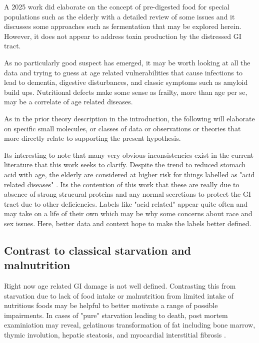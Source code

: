 


A 2025 work did elaborate on the concept of pre-digested
food for special populations such as the elderly
with a detailed review of some issues
\cite{Wu_Pu_Jiang_Enhancing_food_digestion_2025}
and it discusses some approaches such as fermentation
that may be explored herein. However, it does not appear
to address toxin production by the distressed GI 
tract. 

As no particularly good suspect has emerged, it may be worth
looking at all the data and trying to guess at age related
vulnerabilities that cause  infections to lead to dementia,
digestive disturbances, 
and classic symptoms such as amyloid build ups. Nutritional 
defects make some sense as frailty, more than age per se,
may be a correlate of age related diseases.

As in the prior theory description in the introduction, the
following will elaborate on specific small molecules,
or  classes of data or
observations or theories that more directly relate
to supporting the present hypothesis. 


Its interesting to note that many very obvious
 inconsistencies
exist in the current literature that this work seeks to clarify. 
Despite the trend to reduced stomach acid with age, the elderly
are considered at higher risk for things labelled as
"acid related diseases" 
\cite{GREENWALD20048}. Its the contention of this work that
these are really due to absence of strong strucural proteins
and any normal secretions to protect the GI tract due to
other deficiencies. Labels like "acid related"
appear quite often and may take
on a life of their own which may be why some concerns
about race and sex issues. Here, better data and context
hope to make the labels better defined.  


\subsection{Contrast to classical starvation and malnutrition  }
Right now age related GI damage is not well defined.
Contrasting this from starvation due to lack of
food intake or malnutrition from limited intake of
nutritious foods may be helpful to better motivate
a range of possible impairments. In cases of "pure" starvation
leading to death, post mortem examiniation may reveal,
gelatinous transformation of fat including bone marrow,
thymic involution, hepatic steatosis, and myocardial
interstitial fibrosis \cite{Amirante_Pititto_Pulin_Pathology_Starvation_2025}.
 
